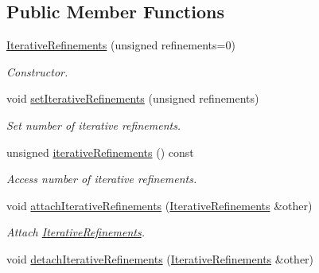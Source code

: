 \subsection*{Public Member Functions}
\begin{DoxyCompactItemize}
\item 
\hyperlink{classSpacy_1_1Mixin_1_1IterativeRefinements_a0cdc2228af8fe052680d24fc4bb7ed6a_a0cdc2228af8fe052680d24fc4bb7ed6a}{Iterative\+Refinements} (unsigned refinements=0)
\begin{DoxyCompactList}\small\item\em Constructor. \end{DoxyCompactList}\item 
void \hyperlink{classSpacy_1_1Mixin_1_1IterativeRefinements_afd8815d6932a99b1700f54162d9f633e_afd8815d6932a99b1700f54162d9f633e}{set\+Iterative\+Refinements} (unsigned refinements)
\begin{DoxyCompactList}\small\item\em Set number of iterative refinements. \end{DoxyCompactList}\item 
unsigned \hyperlink{classSpacy_1_1Mixin_1_1IterativeRefinements_a560cd9428928c941765b71dd7c51ae3b_a560cd9428928c941765b71dd7c51ae3b}{iterative\+Refinements} () const 
\begin{DoxyCompactList}\small\item\em Access number of iterative refinements. \end{DoxyCompactList}\item 
void \hyperlink{classSpacy_1_1Mixin_1_1IterativeRefinements_ad2d1f161aa254d7511df897556e7613e_ad2d1f161aa254d7511df897556e7613e}{attach\+Iterative\+Refinements} (\hyperlink{classSpacy_1_1Mixin_1_1IterativeRefinements}{Iterative\+Refinements} \&other)
\begin{DoxyCompactList}\small\item\em Attach \hyperlink{classSpacy_1_1Mixin_1_1IterativeRefinements}{Iterative\+Refinements}. \end{DoxyCompactList}\item 
\hypertarget{classSpacy_1_1Mixin_1_1IterativeRefinements_aa3b4275d845ef9dabb3f5fefbed43112}{}void \hyperlink{classSpacy_1_1Mixin_1_1IterativeRefinements_aa3b4275d845ef9dabb3f5fefbed43112}{detach\+Iterative\+Refinements} (\hyperlink{classSpacy_1_1Mixin_1_1IterativeRefinements}{Iterative\+Refinements} \&other)\label{classSpacy_1_1Mixin_1_1IterativeRefinements_aa3b4275d845ef9dabb3f5fefbed43112}


\end{DoxyCompactItemize}
